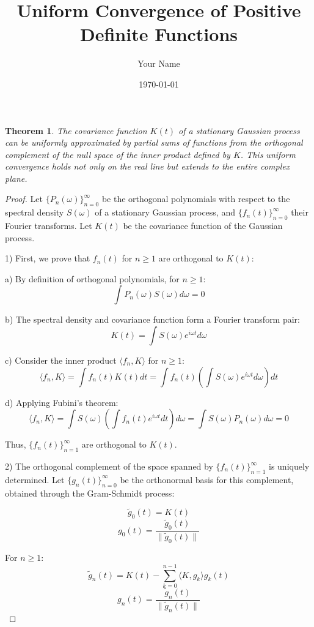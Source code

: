 \documentclass{article}
\title{Uniform Convergence of Positive Definite Functions}
\author{Your Name}
\date{\today}
\newtheorem{theorem}{Theorem}
\begin{document}
\maketitle

\begin{theorem}
The covariance function $K(t)$ of a stationary Gaussian process can be uniformly approximated by partial sums of functions from the orthogonal complement of the null space of the inner product defined by $K$. This uniform convergence holds not only on the real line but extends to the entire complex plane.
\end{theorem}

\begin{proof}
Let $\{P_n(\omega)\}_{n=0}^{\infty}$ be the orthogonal polynomials with respect to the spectral density $S(\omega)$ of a stationary Gaussian process, and $\{f_n(t)\}_{n=0}^{\infty}$ their Fourier transforms. Let $K(t)$ be the covariance function of the Gaussian process.

1) First, we prove that $f_n(t)$ for $n \geq 1$ are orthogonal to $K(t)$:

   a) By definition of orthogonal polynomials, for $n \geq 1$:
      $$\int P_n(\omega)S(\omega)d\omega = 0$$

   b) The spectral density and covariance function form a Fourier transform pair:
      $$K(t) = \int S(\omega)e^{i\omega t}d\omega$$

   c) Consider the inner product $\langle f_n, K \rangle$ for $n \geq 1$:
      $$\langle f_n, K \rangle = \int f_n(t)K(t)dt = \int f_n(t) \left(\int S(\omega)e^{i\omega t}d\omega\right) dt$$

   d) Applying Fubini's theorem:
      $$\langle f_n, K \rangle = \int S(\omega) \left(\int f_n(t)e^{i\omega t}dt\right) d\omega = \int S(\omega)P_n(\omega)d\omega = 0$$

   Thus, $\{f_n(t)\}_{n=1}^{\infty}$ are orthogonal to $K(t)$.

2) The orthogonal complement of the space spanned by $\{f_n(t)\}_{n=1}^{\infty}$ is uniquely determined. Let $\{g_n(t)\}_{n=0}^{\infty}$ be the orthonormal basis for this complement, obtained through the Gram-Schmidt process:

   $$\tilde{g}_0(t) = K(t)$$
   $$g_0(t) = \frac{\tilde{g}_0(t)}{\|\tilde{g}_0(t)\|}$$

   For $n \geq 1$:
   $$\tilde{g}_n(t) = K(t) - \sum_{k=0}^{n-1} \langle K, g_k \rangle g_k(t)$$
   $$g_n(t) = \frac{\tilde{g}_n(t)}{\|\tilde{g}_n(t)\|}$$


\end{proof}
\end{document}
